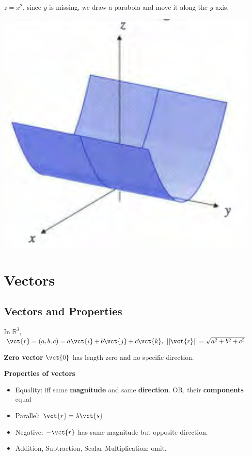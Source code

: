 \begin{spacing}{1.3}
    \eg $z=x^2$, since $y$ is missing, we draw a parabola and move it 
    along the $y$ axis.
    \begin{center}
        \includegraphics[scale=0.3]{images/Ch10-parabola-ymissing.png}
    \end{center}

    \section{Vectors}
    \subsection{Vectors and Properties}

    In $\mathbb{R}^3$, $\vct{r}=(a,b,c)=a\vct{i}+b\vct{j}+c\vct{k},\  
    ||\vct{r}||=\sqrt{a^2+b^2+c^2}$

    {\bf Zero vector} $\vct{0}$ has length zero and no specific direction.

    {\bf Properties of vectors}
    \begin{itemize}
        \item Equality: iff same {\bf magnitude }and same {\bf direction}.
        OR, their {\bf components} equal 
        \item Parallel: $\vct{r}=\lambda \vct{s}$
        \item Negative: $-\vct{r}$ has same magnitude but opposite direction.
        \item Addition, Subtraction, Scalar Multiplication: omit.
    \end{itemize}


\end{spacing}
